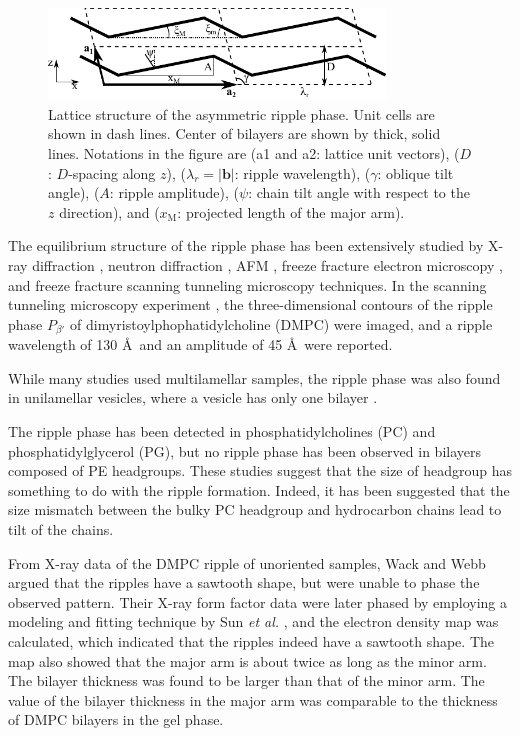 \begin{figure}[htbp]
  \centering
  \includegraphics[width=0.8\textwidth]{figures/ripple/unit_cell}
  \caption[Lattice structure of the asymmetric ripple phase]
  {Lattice structure of the asymmetric ripple phase. Unit cells are shown in
  dash lines. Center of bilayers are shown by thick, solid lines. Notations 
  in the figure are (\gls{a1} and \gls{a2}: lattice unit vectors),
  ($D$: $D$-spacing along $z$), ($\lambda_r=|\mathbf{b}|$: ripple wavelength), 
  ($\gamma$: oblique tilt angle), ($A$: ripple amplitude),
  ($\psi$: chain tilt angle with respect to the $z$ direction),
  and ($x_\textrm{M}$: projected length of the major arm).}
  \label{fig:unit_cell}
\end{figure}

The equilibrium structure of the ripple phase has been extensively studied by
X-ray diffraction \cite{ref:Janiak76,ref:Janiak79,ref:Tardieu73,ref:Wack89,ref:Yao91,ref:Sun96,ref:Cunningham98},
neutron diffraction \cite{ref:Mortensen88,ref:Bradshaw89}, 
AFM \cite{}, freeze fracture electron microscopy \cite{ref:Woodward96},
and freeze fracture scanning tunneling microscopy \cite{} techniques.
In the scanning tunneling microscopy experiment \cite{ref:Zasadzinski88}, 
the three-dimensional contours of the ripple phase $P_{\beta'}$ of
dimyristoylphophatidylcholine (DMPC) were imaged, and
a ripple wavelength of 130 \AA\ and an amplitude of 45 \AA\ were reported.

While many studies used multilamellar samples, the ripple phase was also found in
unilamellar vesicles, where a vesicle has only one bilayer 
\cite{ref:Mason99}.

The ripple phase has been detected in
phosphatidylcholines (PC) and phosphatidylglycerol (PG),
but no ripple phase has been observed in bilayers composed of PE headgroups.
These studies suggest that the size of headgroup has something to do with
the ripple formation. Indeed, it has been suggested that the size mismatch
between the bulky PC headgroup and hydrocarbon chains lead to tilt of 
the chains. 

From X-ray data of the DMPC ripple of unoriented samples, 
Wack and Webb \cite{ref:Wack89} argued that the ripples have a sawtooth shape,
but were unable to phase the observed pattern.
Their X-ray form factor data were later
phased by employing a modeling and fitting technique by Sun \textit{et al.}
\cite{ref:Sun96}, and the electron density map was calculated, which indicated that  
the ripples indeed have a sawtooth shape. The map also showed that
the major arm is about twice as long as the minor arm. The bilayer
thickness was found to be larger than that of the minor arm. The
value of the bilayer thickness in the major arm was comparable to the
thickness of DMPC bilayers in the gel phase.

